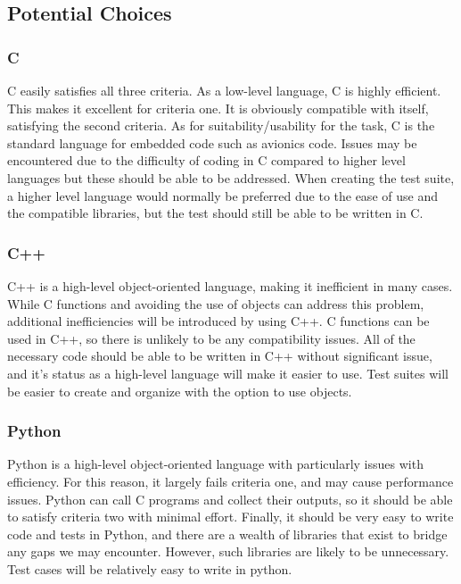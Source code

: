 \documentclass[onecolumn, draftclsnofoot,10pt, compsoc]{IEEEtran}
\begin{document}
\subsection{Potential Choices}
\subsubsection{C}
C easily satisfies all three criteria. As a low-level language, C is highly efficient. This makes it excellent for criteria one. It is obviously compatible with itself, satisfying the second criteria. As for suitability/usability for the task, C is the standard language for embedded code such as avionics code. Issues may be encountered due to the difficulty of coding in C compared to higher level languages but these should be able to be addressed. When creating the test suite, a higher level language would normally be preferred due to the ease of use and the compatible libraries, but the test should still be able to be written in C.

\subsubsection{C++}
C++ is a high-level object-oriented language, making it inefficient in many cases. While C functions and avoiding the use of objects can address this problem, additional inefficiencies will be introduced by using C++. C functions can be used in C++, so there is unlikely to be any compatibility issues. All of the necessary code should be able to be written in C++ without significant issue, and it's status as a high-level language will make it easier to use. Test suites will be easier to create and organize with the option to use objects.

\subsubsection{Python}
Python is a high-level object-oriented language with particularly issues with efficiency. For this reason, it largely fails criteria one, and may cause performance issues. Python can call C programs and collect their outputs, so it should be able to satisfy criteria two with minimal effort. Finally, it should be very easy to write code and tests in Python, and there are a wealth of libraries that exist to bridge any gaps we may encounter. However, such libraries are likely to be unnecessary. Test cases will be relatively easy to write in python.
\end{document}
